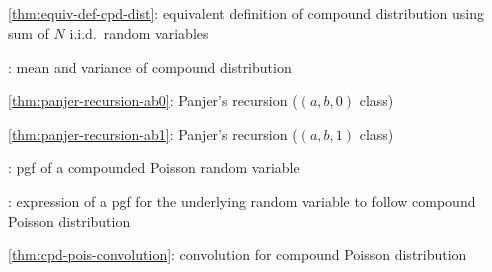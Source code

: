 \subsection*{}
\item \cref{thm:equiv-def-cpd-dist}: equivalent definition of compound
distribution using sum of \(N\) i.i.d.\ random variables
\item {}: mean and variance of compound distribution
\item \cref{thm:panjer-recursion-ab0}: Panjer's recursion (\((a,b,0)\) class)
\item \cref{thm:panjer-recursion-ab1}: Panjer's recursion (\((a,b,1)\) class)
\item {}: pgf of a compounded Poisson random variable
\item {}: expression of a pgf for the
underlying random variable to follow compound Poisson distribution
\item \cref{thm:cpd-pois-convolution}: convolution for compound Poisson distribution
